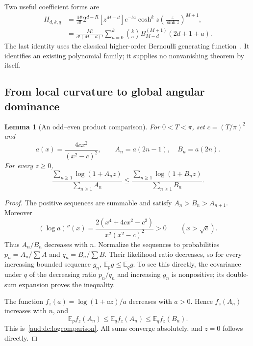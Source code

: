 \documentclass[11pt,a4paper]{article}
\numberwithin{equation}{section}
\newtheorem{lemma}[theorem]{Lemma}
\begin{document}
Two useful coefficient forms are
\begin{align}
 H_{d,k,q}
 &=\frac{M!}{d!}2^{d-R}[z^{M-d}]
 e^{-bz}\cosh^k z\left(\frac z{\sinh z}\right)^{M+1},\label{aud:dc:series}\\
 &=\frac{M!}{d!(M-d)!}\sum_{a=0}^k\binom ka
        B_{M-d}^{(M+1)}(2d+1+a).\label{aud:dc:Bernoulli}
\end{align}
The last identity uses the classical higher-order Bernoulli generating function~\cite{bernoulli}. It identifies an existing polynomial family; it supplies no nonvanishing theorem by itself.

\subsection{From local curvature to global angular dominance}
\begin{lemma}[An odd--even product comparison]\label{aud:dc:comparison}
For $0<T<\pi$, set $c=(T/\pi)^2$ and
\[
 a(x)=\frac{4cx^2}{(x^2-c)^2},\qquad A_n=a(2n-1),\quad B_n=a(2n).
\]
For every $z\ge0$,
\begin{equation}\label{aud:dc:logcomparison}
 \frac{\sum_{n\ge1}\log(1+A_nz)}{\sum_{n\ge1}A_n}
 \le
 \frac{\sum_{n\ge1}\log(1+B_nz)}{\sum_{n\ge1}B_n}.
\end{equation}
\end{lemma}
\begin{proof}
The positive sequences are summable and satisfy $A_n>B_n>A_{n+1}$. Moreover
\[
 (\log a)''(x)=
 \frac{2(x^4+4cx^2-c^2)}{x^2(x^2-c)^2}>0\qquad(x>\sqrt c).
\]
Thus $A_n/B_n$ decreases with $n$. Normalize the sequences to probabilities $p_n=A_n/\sum A$ and $q_n=B_n/\sum B$. Their likelihood ratio decreases, so for every increasing bounded sequence $g_n$, $\mathbb E_p g\le\mathbb E_q g$. To see this directly, the covariance under $q$ of the decreasing ratio $p_n/q_n$ and increasing $g_n$ is nonpositive; its double-sum expansion proves the inequality.

The function $f_z(a)=\log(1+az)/a$ decreases with $a>0$. Hence $f_z(A_n)$ increases with $n$, and
\[
 \mathbb E_p f_z(A_n)\le\mathbb E_q f_z(A_n)
                         \le\mathbb E_q f_z(B_n).
\]
This is~\eqref{aud:dc:logcomparison}. All sums converge absolutely, and $z=0$ follows directly.
\end{proof}
\end{document}
